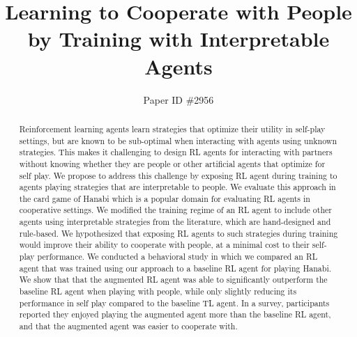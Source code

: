 \documentclass[letterpaper]{article} %
\begin{document}
\newcount\Comments  %
\newcommand{\kibitz}[2]{\ifnum\Comments=1{\color{#1}{#2}}\fi}
\newcommand{\lel}[1]{\kibitz{blue}{[LEL:#1]}}
\newcommand{\kg}[1]{\kibitz{red}{[KG:#1]}}
\newcommand{\uf}[1]{\kibitz{green}{[UF:#1]}}



%
\title{Learning to Cooperate with People by Training with Interpretable Agents}
\author{Paper ID \#2956
}
\maketitle

\begin{abstract}
Reinforcement learning agents learn   strategies that optimize their utility in self-play settings,
but are known to be sub-optimal when interacting with agents using unknown strategies. This makes it challenging to design RL agents for interacting with partners without knowing whether they are people or other artificial agents that optimize for self play.
We propose to address this challenge by exposing  RL agent during training to  agents playing
 strategies that are interpretable to people.
We evaluate this approach in the  card game of Hanabi which is a popular domain for evaluating RL agents in cooperative settings.
We modified the training regime of
an  RL agent to include other  agents using   interpretable  strategies from the literature, which are hand-designed and rule-based.
We hypothesized that exposing  RL agents to such strategies during training would improve their ability to cooperate with people, at a minimal cost to their self-play performance.
We conducted a behavioral study in which we compared an RL agent
that was trained using our approach to a baseline  RL agent for playing Hanabi. We
show that that the augmented RL agent was able to significantly outperform the baseline RL agent when playing with people,
while only slightly reducing its performance in self play compared to the baseline TL agent. In a survey, participants reported they enjoyed playing the augmented agent more than the baseline RL agent, and that the augmented agent was easier to cooperate with.


\end{abstract}
\end{document}
